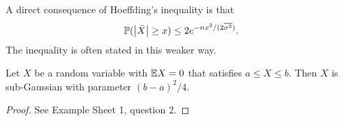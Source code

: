 \begin{remark}
	A direct consequence of Hoeffding's inequality is that
	\[
	\mathbb P(\abs{\bar X} \geq x) \leq 2 e^{-nx^2/(2\overline{\sigma^2})}.
	\]
	The inequality is often stated in this weaker way. 
\end{remark}

\begin{lemma}
	Let $X$ be a random variable with $\mathbb E X = 0$ that satisfies $a \leq X \leq b$. Then $X$ is sub-Gaussian with parameter $(b-a)^2/4$. 
\end{lemma}

\begin{proof}
	See Example Sheet 1, question 2. 
\end{proof}